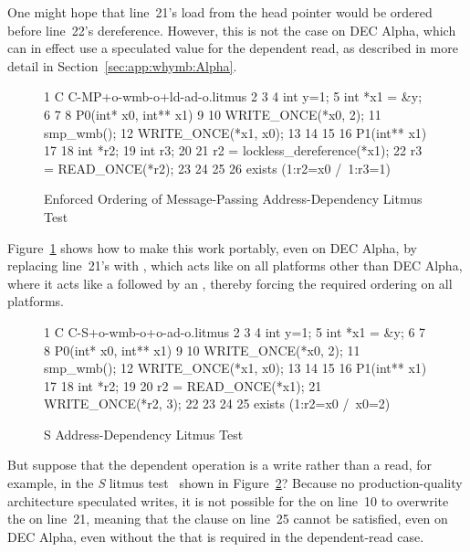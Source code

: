 One might hope that line~21's load from the head pointer would be ordered
before line~22's dereference.
However, this is not the case on DEC Alpha, which can in effect use
a speculated value for the dependent read, as described in more detail in
Section~\ref{sec:app:whymb:Alpha}.

\begin{figure}[tbp]
{ \scriptsize
\begin{verbbox}
 1 C C-MP+o-wmb-o+ld-ad-o.litmus
 2
 3 {
 4 int y=1;
 5 int *x1 = &y;
 6 }
 7
 8 P0(int* x0, int** x1) {
 9
10   WRITE_ONCE(*x0, 2);
11   smp_wmb();
12   WRITE_ONCE(*x1, x0);
13
14 }
15
16 P1(int** x1) {
17
18   int *r2;
19   int r3;
20
21   r2 = lockless_dereference(*x1);
22   r3 = READ_ONCE(*r2);
23
24 }
25
26 exists (1:r2=x0 /\ 1:r3=1)
\end{verbbox}
}
\centering
\theverbbox
\caption{Enforced Ordering of Message-Passing Address-Dependency Litmus Test}
\label{fig:advsync:Enforced Ordering of Message-Passing Address-Dependency Litmus Test}
\end{figure}

Figure~\ref{fig:advsync:Enforced Ordering of Message-Passing Address-Dependency Litmus Test}
shows how to make this work portably, even on DEC Alpha, by
replacing line~21's  with ,
which acts like  on all platforms other than DEC Alpha,
where it acts like a  followed by an ,
thereby forcing the required ordering on all platforms.

\begin{figure}[tbp]
{ \scriptsize
\begin{verbbox}
 1 C C-S+o-wmb-o+o-ad-o.litmus
 2
 3 {
 4 int y=1;
 5 int *x1 = &y;
 6 }
 7
 8 P0(int* x0, int** x1) {
 9
10   WRITE_ONCE(*x0, 2);
11   smp_wmb();
12   WRITE_ONCE(*x1, x0);
13
14 }
15
16 P1(int** x1) {
17
18   int *r2;
19
20   r2 = READ_ONCE(*x1);
21   WRITE_ONCE(*r2, 3);
22
23 }
24
25 exists (1:r2=x0 /\ x0=2)
\end{verbbox}
}
\centering
\theverbbox
\caption{S Address-Dependency Litmus Test}
\label{fig:advsync:S Address-Dependency Litmus Test}
\end{figure}

But suppose that the dependent operation is a write rather than
a read, for example, in the \emph{S}
litmus test~\cite{JadeAlglave2011ppcmem} shown in
Figure~\ref{fig:advsync:S Address-Dependency Litmus Test}?
Because no production-quality architecture speculated writes,
it is not possible for the  on line~10 to overwrite
the  on line~21, meaning that the 
clause on line~25 cannot be satisfied, even on DEC Alpha, even
without the  that is required in the
dependent-read case.

